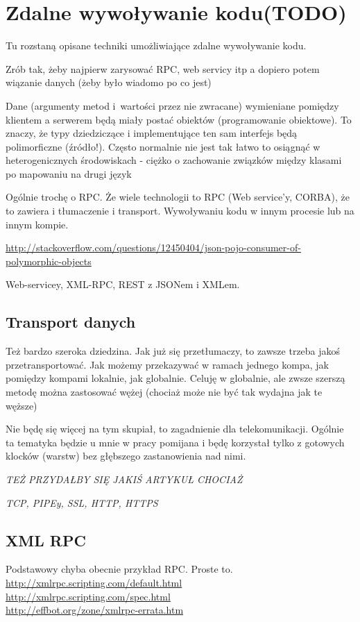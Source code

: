 \section{Zdalne wywoływanie kodu(TODO)}
Tu rozstaną opisane techniki umożliwiające zdalne wywoływanie kodu.

Zrób tak, żeby najpierw zarysować RPC, web servicy itp a dopiero potem wiązanie danych (żeby było wiadomo po co jest)

Dane (argumenty metod i~wartości przez nie zwracane) wymieniane pomiędzy klientem a serwerem będą miały postać obiektów (programowanie obiektowe). To znaczy, że typy dziedziczące i implementujące ten sam interfejs będą polimorficzne (źródło!). Często normalnie nie jest tak łatwo to osiągnąć w heterogenicznych środowiskach - ciężko o zachowanie związków między klasami po mapowaniu na drugi język

Ogólnie trochę o RPC. Że wiele technologii to RPC (Web service'y, CORBA), że to zawiera i tłumaczenie i transport.
Wywoływaniu kodu w innym procesie lub na innym kompie.

\url{http://stackoverflow.com/questions/12450404/json-pojo-consumer-of-polymorphic-objects}

Web-servicey, XML-RPC, REST z JSONem i XMLem. 

\subsection{Transport danych}
Też bardzo szeroka dziedzina. Jak już się przetłumaczy, to zawsze trzeba jakoś przetransportować. Jak możemy przekazywać w ramach jednego kompa, jak pomiędzy kompami lokalnie, jak globalnie.
Celuję w globalnie, ale zwsze szerszą metodę można zastosować wężej (chociaż może nie być tak wydajna jak te węższe)

Nie będę się więcej na tym skupiał, to zagadnienie dla telekomunikacji. Ogólnie ta tematyka będzie u mnie w pracy pomijana i będę korzystał tylko z gotowych klocków (warstw) bez głębszego zastanowienia nad nimi. 

\emph{TEŻ PRZYDAŁBY SIĘ JAKIŚ ARTYKUŁ CHOCIAŻ}

\emph{TCP, PIPEy, SSL, HTTP, HTTPS}

\subsection{XML RPC}
Podstawowy chyba obecnie przykład RPC. Proste to.
\url{http://xmlrpc.scripting.com/default.html}\\
\url{http://xmlrpc.scripting.com/spec.html}\\
\url{http://effbot.org/zone/xmlrpc-errata.htm}\\

